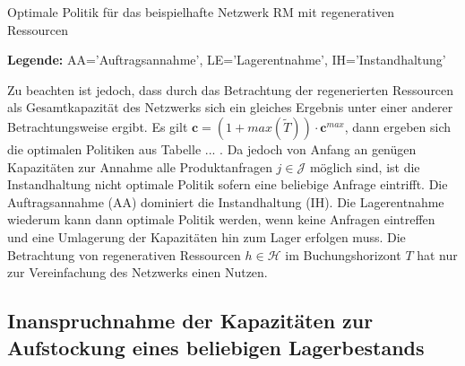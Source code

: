 \begin{table}
\begin{footnotesize}
    \caption{Optimale Politik für das beispielhafte Netzwerk RM mit regenerativen Ressourcen} \label{Tab6}
    \vspace*{3mm}
        \begin{center}
      \end{center}
    \begin{center}
      {\footnotesize \textbf{Legende:} AA='Auftragsannahme', LE='Lagerentnahme', IH='Instandhaltung'} 
      \end{center}
\end{footnotesize}
\end{table}


Zu beachten ist jedoch, dass durch das Betrachtung der regenerierten Ressourcen als Gesamtkapazität des Netzwerks sich ein gleiches Ergebnis unter einer anderer Betrachtungsweise ergibt. Es gilt $\textbf{c}=(1+max(\tilde{T}))\cdot \textbf{c}^{max}$, dann ergeben sich die optimalen Politiken aus Tabelle ... . Da jedoch von Anfang an genügen Kapazitäten zur Annahme alle Produktanfragen $j\in\mathcal{J}$ möglich sind, ist die Instandhaltung nicht optimale Politik sofern eine beliebige Anfrage eintrifft. Die Auftragsannahme (AA) dominiert die Instandhaltung (IH). Die Lagerentnahme wiederum kann dann optimale Politik werden, wenn keine Anfragen eintreffen und eine Umlagerung der Kapazitäten hin zum Lager erfolgen muss. Die Betrachtung von regenerativen Ressourcen $h\in\mathcal{H}$ im Buchungshorizont $T$ hat nur zur Vereinfachung des Netzwerks einen Nutzen.



\subsection{Inanspruchnahme der Kapazitäten zur Aufstockung eines beliebigen Lagerbestands}

